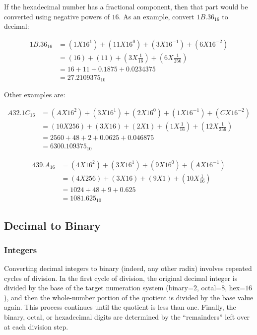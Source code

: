 If the hexadecimal number has a fractional component, then that part would be converted using negative powers of $ 16 $. As an example, convert $ 1B.36_{16} $ to decimal:

\begin{align}
  1B.36_{16} &= (1X16^1)+(11X16^0)+(3X16^{-1})+(6X16^{-2}) \\
  \nonumber
  &= (16)+(11)+(3X\frac{1}{16})+(6X\frac{1}{256}) \\
  \nonumber
  &= 16+11+0.1875+0.0234375 \\
  \nonumber
  &= 27.2109375_{10}
\end{align}

Other examples are:

\begin{align}
  A32.1C_{16} &= (AX16^2)+(3X16^1)+(2X16^0)+(1X16^{-1})+(CX16^{-2}) \\
  \nonumber
  &= (10X256)+(3X16)+(2X1)+(1X\frac{1}{16})+(12X\frac{1}{256}) \\
  \nonumber
  &= 2560+48+2+0.0625+0.046875 \\
  \nonumber
  &= 6300.109375_{10}
\end{align}

\begin{align}
  439.A_{16} &= (4X16^2)+(3X16^1)+(9X16^0)+(AX16^{-1}) \\
  \nonumber
  &= (4X256)+(3X16)+(9X1)+(10X\frac{1}{16}) \\
  \nonumber
  &= 1024+48+9+0.625 \\
  \nonumber
  &= 1081.625_{10}
\end{align}

\subsection{Decimal to Binary} 
\label{MF:sub:decimal_to_binary}
\subsubsection{Integers} 
\label{MF:subsub:decimal_to_binary_integers}

 Converting decimal integers to binary (indeed, any other radix) involves repeated cycles of division. In the first cycle of division, the original decimal integer is divided by the base of the target numeration system (binary=$ 2 $, octal=$ 8 $, hex=$ 16 $), and then the whole-number portion of the quotient is divided by the base value again. This process continues until the quotient is less than one. Finally, the binary, octal, or hexadecimal digits are determined by the ``remainders'' left over at each division step. 

